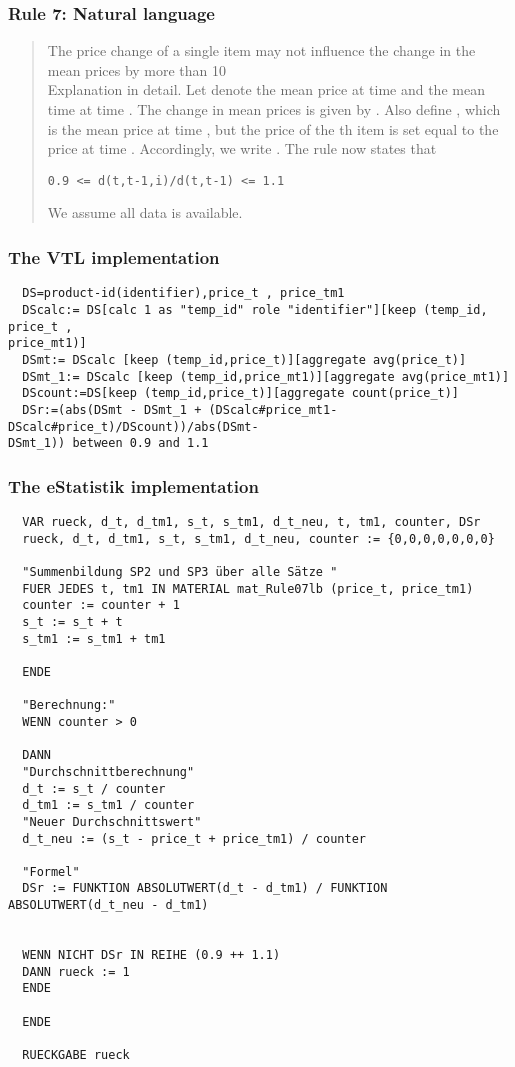 \subsubsection*{  Rule 7: Natural language}
\begin{quote}


The price change of a single item may not influence the change in the mean prices by more than 10\\%

Explanation in detail. Let  denote the mean price at time  and  the mean time at time .
The change in mean prices is given by . Also define , which is the
mean price at time , but the price of the th item is set equal to the price at time . Accordingly, we write . The rule now states that
\begin{verbatim}
0.9 <= d(t,t-1,i)/d(t,t-1) <= 1.1
\end{verbatim}

We assume all data is available.


\end{quote}
\subsubsection*{The VTL implementation}
\begin{verbatim}
  DS=product-id(identifier),price_t , price_tm1
  DScalc:= DS[calc 1 as "temp_id" role "identifier"][keep (temp_id, price_t ,
price_mt1)]
  DSmt:= DScalc [keep (temp_id,price_t)][aggregate avg(price_t)]
  DSmt_1:= DScalc [keep (temp_id,price_mt1)][aggregate avg(price_mt1)]
  DScount:=DS[keep (temp_id,price_t)][aggregate count(price_t)]
  DSr:=(abs(DSmt - DSmt_1 + (DScalc#price_mt1- DScalc#price_t)/DScount))/abs(DSmt-
DSmt_1)) between 0.9 and 1.1
\end{verbatim}
\subsubsection*{The eStatistik implementation}
\begin{verbatim}
  VAR rueck, d_t, d_tm1, s_t, s_tm1, d_t_neu, t, tm1, counter, DSr
  rueck, d_t, d_tm1, s_t, s_tm1, d_t_neu, counter := {0,0,0,0,0,0,0}

  "Summenbildung SP2 und SP3 über alle Sätze "
  FUER JEDES t, tm1 IN MATERIAL mat_Rule07lb (price_t, price_tm1)
  counter := counter + 1
  s_t := s_t + t
  s_tm1 := s_tm1 + tm1

  ENDE

  "Berechnung:"
  WENN counter > 0

  DANN
  "Durchschnittberechnung"
  d_t := s_t / counter
  d_tm1 := s_tm1 / counter
  "Neuer Durchschnittswert"
  d_t_neu := (s_t - price_t + price_tm1) / counter

  "Formel"
  DSr := FUNKTION ABSOLUTWERT(d_t - d_tm1) / FUNKTION ABSOLUTWERT(d_t_neu - d_tm1)


  WENN NICHT DSr IN REIHE (0.9 ++ 1.1)
  DANN rueck := 1
  ENDE

  ENDE

  RUECKGABE rueck
\end{verbatim}
